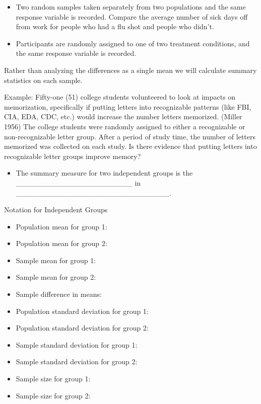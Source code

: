 \documentclass[
]{report}
\providecommand{\tightlist}{%
  \setlength{\itemsep}{0pt}\setlength{\parskip}{0pt}}
\begin{document}

\begin{itemize}
\item
  Two random samples taken separately from two populations and the same response variable is recorded. Compare the average number of sick days off from work for people who had a flu shot and people who didn't.
\item
  Participants are randomly assigned to one of two treatment conditions, and the same response variable is recorded.
\end{itemize}

Rather than analyzing the differences as a single mean we will calculate summary statistics on each sample.

Example: Fifty-one (51) college students volunteered to look at impacts on memorization, specifically if putting letters into recognizable patterns (like FBI, CIA, EDA, CDC, etc.) would increase the number letters memorized. (Miller 1956) The college students were randomly assigned to either a recognizable or non-recognizable letter group. After a period of study time, the number of letters memorized was collected on each study. Is there evidence that putting letters into recognizable letter groups improve memory?


\begin{itemize}
\tightlist
\item
  The summary measure for two independent groups is the \_\_\_\_\_\_\_\_\_\_\_\_\_\_\_\_\_\_\_\_\_\_ in \_\_\_\_\_\_\_\_\_\_\_\_\_\_\_\_\_\_\_\_\_\_\_\_\_\_\_\_\_.
\end{itemize}



Notation for Independent Groups

\begin{itemize}
\item
  Population mean for group 1:
\item
  Population mean for group 2:
\item
  Sample mean for group 1:
\item
  Sample mean for group 2:
\item
  Sample difference in means:
\item
  Population standard deviation for group 1:
\item
  Population standard deviation for group 2:
\item
  Sample standard deviation for group 1:
\item
  Sample standard deviation for group 2:
\item
  Sample size for group 1:
\item
  Sample size for group 2:
\end{itemize}
\end{document}

